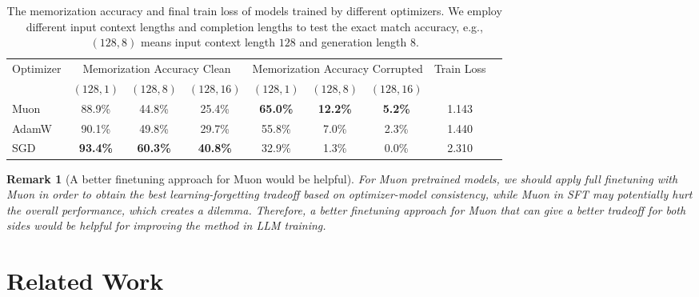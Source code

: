 \documentclass{article}
\newtheorem{remark}{Remark}
\theoremstyle{remark}
\begin{document}
\begin{table}[ht]
    \centering
    \vspace{-0.4cm}
    \caption{The memorization accuracy and final train loss of models trained by different optimizers. We employ different input context lengths and completion lengths to test the exact match accuracy, e.g., $(128, 8)$ means input context length $128$ and generation length $8$. } \vspace{-0.1cm}
    \label{tab:memorization_accuracy_corrupted_real}
\vspace{0.2cm}
\begin{tabular}{lcccccccc}
\toprule
\multirow{2}{*}{Optimizer} & \multicolumn{3}{c}{Memorization Accuracy Clean} & \multicolumn{3}{c}{Memorization Accuracy Corrupted} 
& \multirow{2}{*}{Train Loss} 
\\
\cmidrule(lr){2-4} \cmidrule(lr){5-7} 
& $(128,1)$ & $(128,8)$ & $(128,16)$ & $(128,1)$ & $(128,8)$ & $(128,16)$ \\
\midrule


Muon & 88.9\% & 44.8\% & 25.4\% & \textbf{65.0\%} & \textbf{12.2\%} & \textbf{5.2\%} & 1.143 \\

AdamW & 90.1\% & 49.8\% & 29.7\% & 55.8\% & 7.0\% & 2.3\% & 1.440 \\

SGD & \textbf{93.4\%} & \textbf{60.3\%} & \textbf{40.8\%} & 32.9\% & 1.3\% & 0.0\% & 2.310 \\

\bottomrule
\end{tabular}

\vspace{-0.1cm}


\end{table}


\begin{remark}[A better finetuning approach for Muon would be helpful]
    For Muon pretrained models, we should apply full finetuning with Muon in order to obtain the best learning-forgetting tradeoff based on optimizer-model consistency, while Muon in SFT may potentially hurt the overall performance, which creates a dilemma. Therefore, a better finetuning approach for Muon that can give a better tradeoff for both sides would be helpful for improving the method in LLM training.
\end{remark}



\section{Related Work}\label{sec:related_work}
\end{document}
